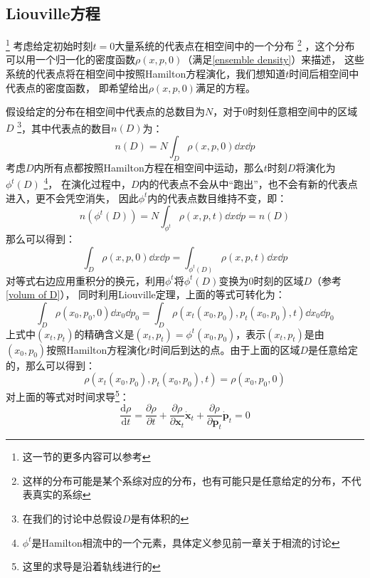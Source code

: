     \subsection{Liouville方程}
    \footnote{这一节的更多内容可以参考\cite{Tuckerman2010Statistical2}}
    考虑给定初始时刻$t=0$大量系统的代表点在相空间中的一个分布
    \footnote{这样的分布可能是某个系综对应的分布，也有可能只是任意给定的分布，不代表真实的系综}
    ，这个分布可以用一个归一化的密度函数$\rho(x, p, 0)$（满足\ref{ensemble density}）来描述，
    这些系统的代表点将在相空间中按照Hamilton方程演化，我们想知道$t$时间后相空间中代表点的密度函数，
    即希望给出$\rho(x, p, 0)$满足的方程。
    \par
    假设给定的分布在相空间中代表点的总数目为$N$，对于0时刻任意相空间中的区域$D$
    \footnote{在我们的讨论中总假设$D$是有体积的}，其中代表点的数目$n(D)$为：
    \begin{equation}
        n(D) = N\int_{D}\rho(x, p, 0)\dd x\dd p
    \end{equation}
    考虑$D$内所有点都按照Hamilton方程在相空间中运动，那么$t$时刻$D$将演化为$\phi^t(D)$
    \footnote{$\phi^t$是Hamilton相流中的一个元素，具体定义参见前一章关于相流的讨论}，
    在演化过程中，$D$内的代表点不会从中“跑出”，也不会有新的代表点进入，更不会凭空消失，
    因此$\phi^t$内的代表点数目维持不变，即：
    \begin{equation}
        n(\phi^t(D)) = N\int_{\phi^t}\rho(x, p, t)\dd x\dd p = n(D)
    \end{equation}
    那么可以得到：
    \begin{equation}
        \int_{D}\rho(x, p, 0)\dd x\dd p = \int_{\phi^t(D)}\rho(x, p, t)\dd x\dd p
    \end{equation}
    对等式右边应用重积分的换元，利用$\phi^t$将$\phi^t(D)$变换为0时刻的区域$D$（参考\ref{volum of D}），
    同时利用Liouville定理，上面的等式可转化为：
    \begin{equation}
        \int_{D}\rho(x_0, p_0, 0)\dd x_0\dd p_0 = \int_{D}\rho(x_t(x_0, p_0), p_t(x_0, p_0), t)\dd x_0 \dd p_0
    \end{equation}
    上式中$(x_t, p_t)$的精确含义是$(x_t, p_t) = \phi^t(x_0, p_0)$，表示$(x_t, p_t)$是由
    $(x_0, p_0)$按照Hamilton方程演化$t$时间后到达的点。由于上面的区域$D$是任意给定的，那么可以得到：
    \begin{equation}
        \rho(x_t(x_0, p_0), p_t(x_0, p_0), t) = \rho(x_0, p_0, 0)
    \end{equation}
    对上面的等式对时间求导\footnote{这里的求导是沿着轨线进行的}：
    \begin{equation}
        \frac{\mathrm{d}\rho}{\mathrm{d}t} = \frac {\partial \rho}{\partial t} + \frac {\partial \rho}{\partial \bm{x}_t}\dot{\bm{x}}_t  + \frac {\partial \rho}{\partial \bm{p}_t} \dot{\bm{p}}_t = 0
    \end{equation}

